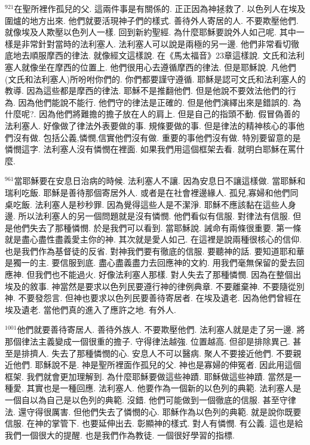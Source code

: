 \documentclass{book}
\begin{document}
$^{921}$在聖所裡作孤兒的父.
這兩件事是有關係的.
正正因為神拯救了.
以色列人在埃及圍爐的地方出來.
他們就要活現神子們的樣式.
善待外人寄居的人.
不要欺壓他們.
就像埃及人欺壓以色列人一樣.
回到新約聖經.
為什麼耶穌要說外人如己呢.
其中一樣是非常針對當時的法利塞人.
法利塞人可以說是兩極的另一邊.
他們非常看切徹底地去順服摩西的律法.
就像經文這樣說.
在《馬太福音》23章這樣說.
文氏和法利塞人就像坐在摩西的位置上.
他們很用心去遵循摩西的律法.
但是耶穌說.
凡他們(文氏和法利塞人)所吩咐你們的.
你們都要謹守遵循.
耶穌是認可文氏和法利塞人的教導.
因為這些都是摩西的律法.
耶穌不是推翻他們.
但是他說不要效法他們的行為.
因為他們能說不能行.
他們守的律法是正確的.
但是他們演繹出來是錯誤的.
為什麼呢?.
因為他們將難擔的擔子放在人的肩上.
但是自己的指頭不動.
假冒偽善的法利塞人.
好像做了律法外表要做的事.
規條要做的事.
但是律法的精神核心的事他們沒有做.
包括公義,憐憫,信實他們沒有做.
重要的事他們沒有做.
特別要留意的是憐憫這字.
法利塞人沒有憐憫在裡面.
如果我們用這個框架去看.
就明白耶穌在罵什麼.

$^{961}$當耶穌要在安息日治病的時候.
法利塞人不讓.
因為安息日不讓這樣做.
當耶穌和瑞利吃飯.
耶穌是善待那個寄居外人.
或者是在社會裡邊緣人.
孤兒,寡婦和他們同桌吃飯.
法利塞人是秒秒罪.
因為覺得這些人是不潔淨.
耶穌不應該黏在這些人身邊.
所以法利塞人的另一個問題就是沒有憐憫.
他們看似有信服.
對律法有信服.
但是他們失去了那種憐憫.
於是我們可以看到.
當耶穌說.
誡命有兩條很重要.
第一條就是盡心盡性盡義愛主你的神.
其次就是愛人如己.
在這裡是說兩種很核心的信仰.
也是我們作為基督徒的反省.
對神我們要有徹底的信服.
要聽神的話.
要知道耶和華是獨一的主.
要信服到底.
盡心盡義盡力去回應神的文約.
用我們毫無保留的愛去回應神.
但我們也不能過火.
好像法利塞人那樣.
對人失去了那種憐憫.
因為在整個出埃及的敘事.
神當然是要求以色列民要遵行神的律例典章.
不要離棄神.
不要隨從別神.
不要發怨言.
但神也要求以色列民要善待寄居者.
在埃及遺老.
因為他們曾經在埃及遺老.
當他們真的進入了應許之地.
有外人.

$^{1001}$他們就要善待寄居人.
善待外族人.
不要欺壓他們.
法利塞人就是走了另一邊.
將那個律法主義變成一個很重的擔子.
守得律法越強.
位置越高.
但卻是排除異己.
甚至是排擠人.
失去了那種憐憫的心.
安息人不可以醫病.
聚人不要接近他們.
不要親近他們.
耶穌說不是.
神是聖所裡面作孤兒的父.
神也是寡婦的伸冤者.
因此用這個框架.
我們就會更加理解到.
為什麼耶穌要做這些神蹟.
耶穌做這些神蹟.
當然是一種愛.
其實也是一種回應.
法利塞人.
他要作為一個新的以色列的典範.
法利塞人是一個自以為自己是以色列的典範.
沒錯.
他們可能做到一個徹底的信服.
甚至守律法.
還守得很厲害.
但他們失去了憐憫的心.
耶穌作為以色列的典範.
就是說你既要信服.
在神的掌管下.
也要延伸出去.
彰顯神的樣式.
對人有憐憫.
有公義.
這也是給我們一個很大的提醒.
也是我們作為教徒.
一個很好學習的指標.
\end{document}
